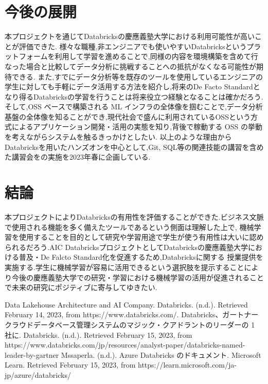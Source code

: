\documentclass[twocolumn]{jsarticle}
\begin{document}
\section{今後の展開}
本プロジェクトを通じてDatabricksの慶應義塾大学における利用可能性が高いことが評価できた.
様々な職種,非エンジニアでも使いやすいDatabricksというプラットフォームを利用して学習を進めることで,同様の内容を環境構築を含めて行なった場合と比較してデータ分析に挑戦することへの抵抗がなくなる可能性が期待できる.
また,すでにデータ分析等を既存のツールを使用しているエンジニアの学生に対しても手軽にデータ活用する方法を紹介し,将来のDe Facto Standardとなり得るDatabricksの学習を行うことは将来役立つ経験となることは確かだろう.
そして,OSS ベースで構築される ML インフラの全体像を掴むことで,データ分析基盤の全体像を知ることができ,現代社会で盛んに利用されているOSSという方式によるアプリケーション開発・活用の実態を知り,背後で稼動する OSS の挙動を考えながらシステムを触るきっかけとしたい.
以上のような理由からDatabricksを用いたハンズオンを中心として,Git, SQL等の関連技能の講習を含めた講習会をの実施を2023年春に企画している.
\section{結論}
本プロジェクトによりDatabricksの有用性を評価することができた.ビジネス文脈で使用される機能を多く備えたツールであるという側面は理解した上で,
機械学習を使用することを目的として研究や学習用途で学生が使う有用性は大いに認められるだろう.AIC DatabricksプロジェクトとしてDatabricksの慶應義塾大学における普及・De Falcto Standard化を促進するため,Databricksに関する
授業提供を実施する.学生に機械学習が容易に活用できるという選択肢を提示することにより今後の慶應義塾大学での研究・学習における機械学習の活用が促進されることで未来の研究にポジティブに寄与してゆきたい.

\begin{thebibliography}{3}
  \footnotesize
   Data Lakehouse Architecture and AI Company. Databricks. (n.d.). Retrieved February 14, 2023, from https://www.databricks.com/.
   Databricks、ガートナー クラウドデータベース管理システムのマジック・クアドラントのリーダーの 1 社に. Databricks. (n.d.). Retrieved February 15, 2023, from https://www.databricks.com/jp/resources/analyst-paper/databricks-named-leader-by-gartner
   Mssaperla. (n.d.). Azure Databricks のドキュメント. Microsoft Learn. Retrieved February 15, 2023, from https://learn.microsoft.com/ja-jp/azure/databricks/ 
  \end{thebibliography}
\end{document}
